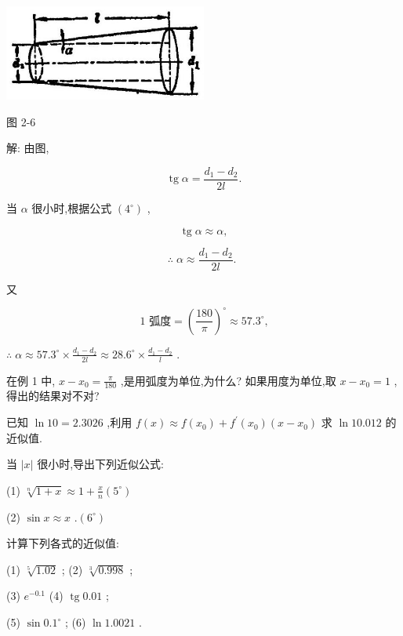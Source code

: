 \documentclass[lang=cn,newtx,12pt,scheme=chinese]{elegantbook}
\begin{document}
\begin{center}
\includegraphics[max width=0.5\textwidth]{images/01912c18-5c3f-733d-b775-749ba9897a9d_120_883650.jpg}
\end{center}

图 2-6

解: 由图,

\[
\operatorname{tg}\alpha = \frac{{d}_{1} - {d}_{2}}{2l}.
\]

当 \(\alpha\) 很小时,根据公式 \(\left( {4}^{ \circ }\right)\) ,

\[
\operatorname{tg}\alpha \approx \alpha ,
\]

\[
\therefore \;\alpha \approx \frac{{d}_{1} - {d}_{2}}{2l}\text{. }
\]

又

\[
\text{1 弧度} = {\left( \frac{180}{\pi }\right) }^{ \circ } \approx {57.3}^{ \circ }\text{,}
\]

\(\therefore \;\alpha \approx {57.3}^{ \circ } \times \frac{{d}_{1} - {d}_{2}}{2l} \approx {28.6}^{ \circ } \times \frac{{d}_{1} - {d}_{2}}{l}\) .

\begin{problemset}[练习]

\item 在例 1 中, \(x - {x}_{0} = \frac{\pi }{180}\) ,是用弧度为单位,为什么? 如果用度为单位,取 \(x - {x}_{0} = 1\) ,得出的结果对不对?

\item 已知 \(\ln {10} = {2.3026}\) ,利用 \(f\left( x\right) \approx f\left( {x}_{0}\right) + {f}^{\prime }\left( {x}_{0}\right) \left( {x - {x}_{0}}\right)\) 求 \(\ln {10.012}\) 的近似值.

\item 当 \(\left| x\right|\) 很小时,导出下列近似公式:

(1) \(\sqrt[n]{1 + x} \approx 1 + \frac{x}{n}\)\(\left( {5}^{ \circ }\right)\)

(2) \(\sin x \approx x\) .\(\left( {6}^{ \circ }\right)\)

\item 计算下列各式的近似值:

(1) \(\sqrt[5]{1.02}\) ; (2) \(\sqrt[3]{0.998}\) ;

(3) \({e}^{-{0.1}}\) (4) \(\operatorname{tg}{0.01}\) ;

(5) \(\sin {0.1}^{ \circ }\) ; (6) \(\ln {1.0021}\) .

\end{problemset}
\end{document}
